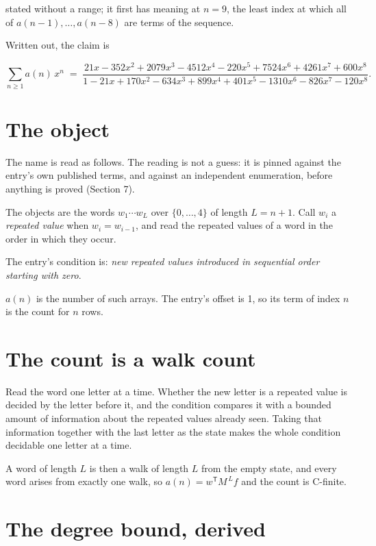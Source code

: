 \documentclass[11pt]{article}
\theoremstyle{definition}
\begin{document}
stated without a range; it first has meaning at $n = 9$, the least index at which all of $a(n-1),\dots,a(n-8)$ are terms of the sequence.

Written out, the claim is

\[\sum_{n \ge 1} a(n)\,x^n \;=\; \frac{21x - 352x^{2} + 2079x^{3} - 4512x^{4} - 220x^{5} + 7524x^{6} + 4261x^{7} + 600x^{8}}{1 - 21x + 170x^{2} - 634x^{3} + 899x^{4} + 401x^{5} - 1310x^{6} - 826x^{7} - 120x^{8}}.\]

\section{The object}

The name is read as follows. The reading is not a guess: it is pinned against the entry's own published terms, and against an independent enumeration, before anything is proved (Section 7).

The objects are the words $w_1\cdots w_L$ over $\{0,\dots,4\}$ of length $L = n + 1$. Call $w_i$ a {\itshape repeated value} when $w_i = w_{i-1}$, and read the repeated values of a word in the order in which they occur.

The entry's condition is: {\itshape new repeated values introduced in sequential order starting with zero}.

$a(n)$ is the number of such arrays. The entry's offset is 1, so its term of index $n$ is the count for $n$ rows.

\section{The count is a walk count}

Read the word one letter at a time. Whether the new letter is a repeated value is decided by the letter before it, and the condition compares it with a bounded amount of information about the repeated values already seen. Taking that information together with the last letter as the state makes the whole condition decidable one letter at a time.

A word of length $L$ is then a walk of length $L$ from the empty state, and every word arises from exactly one walk, so $a(n) = w^{\mathsf T}M^{\,L}f$ and the count is C-finite.

\section{The degree bound, derived}
\end{document}
